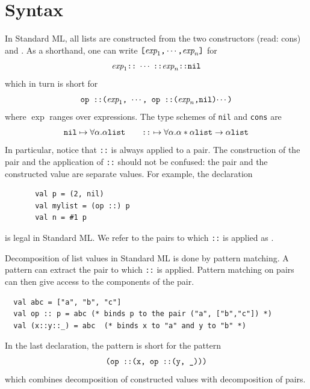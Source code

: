 \documentclass[12pt]{book}
\begin{document}
\section{Syntax}
\label{lsyn.sec}
In Standard ML, all lists are constructed 
from the two constructors \boxml{::} (read: cons)
and .   
As a shorthand, one can write $\hbox{\tt [}\hbox{\it exp}_1\hbox{\tt ,}\cdots
\hbox{\tt ,}\hbox{\it exp}_n\hbox{\tt ]}$ for
$$ \hbox{\it exp}_1\hbox{\tt ::}\; \cdots\; \hbox{\tt ::} \hbox{\it exp}_n\hbox{\tt ::}\hbox{\tt nil}$$
which in turn is short for
$$ \hbox{\tt op ::($\hbox{\it exp}_1$, $\cdots$, op ::($\hbox{\it exp}_n$,nil)$\cdots$)}$$
where $\exp$ ranges over expressions. 
The type schemes of {\tt nil} and {\tt cons} are
$$\hbox{\tt nil}\mapsto\forall\alpha.\alpha\hbox{\tt list}\qquad
  \hbox{\tt ::} \mapsto\forall\alpha.\alpha\ast\alpha\hbox{\tt list}\to\alpha\hbox{\tt list}
$$
In particular, notice that {\tt ::} is always applied to a pair. The construction
of the pair and the application of {\tt ::} should not be confused: the pair and the
constructed value are separate values.
For example, the declaration
\begin{verbatim}
       val p = (2, nil)
       val mylist = (op ::) p
       val n = #1 p
\end{verbatim}
is legal in Standard ML. We refer to the pairs to which {\tt ::} is applied
as .

Decomposition of list values in Standard ML is done by pattern matching.
A pattern can extract the pair to which {\tt ::} is applied. Pattern matching
on pairs can then give access to the components of the pair. 
\begin{verbatim}
  val abc = ["a", "b", "c"]
  val op :: p = abc (* binds p to the pair ("a", ["b","c"]) *)
  val (x::y::_) = abc  (* binds x to "a" and y to "b" *)
\end{verbatim}
In the last declaration, the pattern  is short for the pattern
$$\hbox{\tt (op ::(x, op ::(y, \_)))}$$ which combines decomposition of constructed
values with decomposition of pairs.
\end{document}
